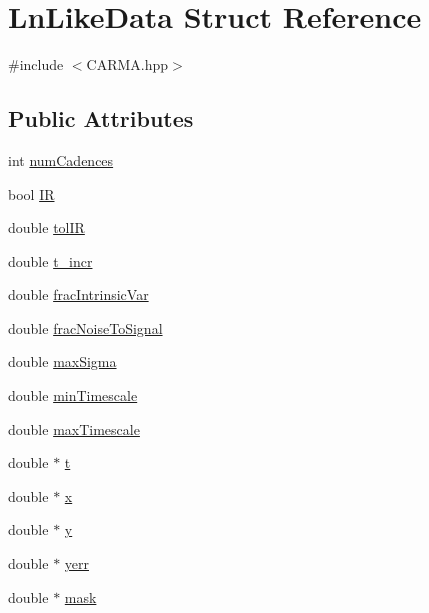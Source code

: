 \hypertarget{struct_ln_like_data}{\section{Ln\-Like\-Data Struct Reference}
\label{struct_ln_like_data}
}


{\ttfamily \#include $<$C\-A\-R\-M\-A.\-hpp$>$}

\subsection*{Public Attributes}
\begin{DoxyCompactItemize}
\item 
int \hyperlink{struct_ln_like_data_a825ffbe1d96bd9f1c913ed95c83fd8de}{num\-Cadences}
\item 
bool \hyperlink{struct_ln_like_data_af49dc41383840c47d9e03c154c510912}{I\-R}
\item 
double \hyperlink{struct_ln_like_data_a0fcbb2527d414cc2b0fe576a7a61f45c}{tol\-I\-R}
\item 
double \hyperlink{struct_ln_like_data_acbb8573027fb54b1d207c126a64c49c9}{t\-\_\-incr}
\item 
double \hyperlink{struct_ln_like_data_a883ba357c5e5a7eff7fb9a25f130a0e7}{frac\-Intrinsic\-Var}
\item 
double \hyperlink{struct_ln_like_data_a9d90bcfebe1eec966719b8c0febb7dc7}{frac\-Noise\-To\-Signal}
\item 
double \hyperlink{struct_ln_like_data_ae30e91660af267721f78434f5e771293}{max\-Sigma}
\item 
double \hyperlink{struct_ln_like_data_a429a07a037a45e99a52c0c9e6193b23d}{min\-Timescale}
\item 
double \hyperlink{struct_ln_like_data_ab1c1eb4d8e84c78b1b76849adfd0aeb8}{max\-Timescale}
\item 
double $\ast$ \hyperlink{struct_ln_like_data_a5b1bf48c4b998b85df9c381974e65f93}{t}
\item 
double $\ast$ \hyperlink{struct_ln_like_data_afd71e6e5c9f90880038586d6f4e705fe}{x}
\item 
double $\ast$ \hyperlink{struct_ln_like_data_ac75cc1e68fffac23d841e09f927a0a53}{y}
\item 
double $\ast$ \hyperlink{struct_ln_like_data_a54330ef049f623a902d04f58e5aee208}{yerr}
\item 
double $\ast$ \hyperlink{struct_ln_like_data_a51c6e3bd71666d529910318735f0df21}{mask}
\end{DoxyCompactItemize}


